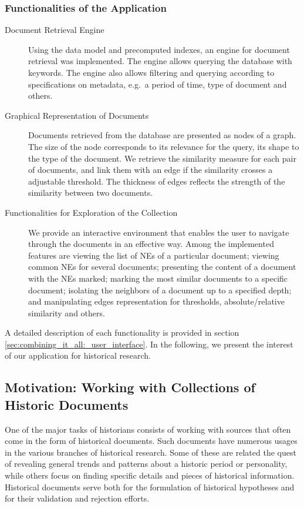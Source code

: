 \subsubsection{Functionalities of the Application}
\begin{description}
\item[Document Retrieval Engine] Using the data model and precomputed indexes, an engine for document retrieval was implemented. 
The engine allows querying the database with keywords. The engine also allows filtering and querying according to specifications on metadata, e.g.\ a period of time, type of document and others. 
\item[Graphical Representation of Documents] Documents retrieved from the database are presented as nodes of a graph. The size of the node corresponds to its relevance for the query, its shape to the type of the document. We retrieve the similarity measure for each pair of documents, and link them with an edge if the similarity crosses a adjustable threshold. The thickness of edges reflects the strength of the similarity between two documents.
\item[Functionalities for Exploration of the Collection] We provide an interactive environment that enables the user to navigate through the documents in an effective way. Among the implemented features are viewing the list of NEs of a particular document; viewing common NEs for several documents; presenting the content of a document with the NEs marked; marking the most similar documents to a specific document; isolating the neighbors of a document up to a specified depth; and manipulating edges representation for thresholds, absolute/relative similarity and others.
\end{description}

A detailed description of each functionality is provided in section \ref{sec:combining_it_all:_user_interface}. In the following, we present the interest of our application for historical research. 

\subsection{Motivation: Working with Collections of Historic Documents}
\label{sec:motivation}
One of the major tasks of historians consists of working with sources that often come in the form of historical documents. 
Such documents have numerous usages in the various branches of historical research. Some of these are related the quest of revealing 
general trends and patterns about a historic period or personality, while others focus on finding specific details and pieces of historical 
information. Historical documents serve both for the formulation of historical hypotheses and for their validation and rejection efforts. 

